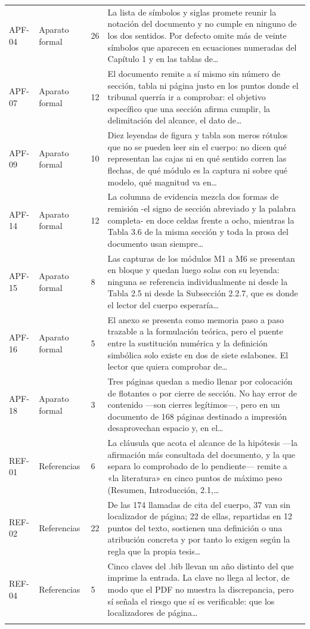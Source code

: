 {\begin{longtable}{@{}L{1.4cm}L{2.6cm}L{1.2cm}L{10.05cm}@{}}
APF-04 & Aparato formal & 26 & La lista de símbolos y siglas promete reunir la notación del documento y no cumple en ninguno de los dos sentidos. Por defecto omite más de veinte símbolos que aparecen en ecuaciones numeradas del Capítulo 1 y en las tablas de…\\\addlinespace[2pt]
APF-07 & Aparato formal & 12 & El documento remite a sí mismo sin número de sección, tabla ni página justo en los puntos donde el tribunal querría ir a comprobar: el objetivo específico que una sección afirma cumplir, la delimitación del alcance, el dato de…\\\addlinespace[2pt]
APF-09 & Aparato formal & 10 & Diez leyendas de figura y tabla son meros rótulos que no se pueden leer sin el cuerpo: no dicen qué representan las cajas ni en qué sentido corren las flechas, de qué módulo es la captura ni sobre qué modelo, qué magnitud va en…\\\addlinespace[2pt]
APF-14 & Aparato formal & 12 & La columna de evidencia mezcla dos formas de remisión -el signo de sección abreviado y la palabra completa- en doce celdas frente a ocho, mientras la Tabla 3.6 de la misma sección y toda la prosa del documento usan siempre…\\\addlinespace[2pt]
APF-15 & Aparato formal & 8 & Las capturas de los módulos M1 a M6 se presentan en bloque y quedan luego solas con su leyenda: ninguna se referencia individualmente ni desde la Tabla 2.5 ni desde la Subsección 2.2.7, que es donde el lector del cuerpo esperaría…\\\addlinespace[2pt]
APF-16 & Aparato formal & 5 & El anexo se presenta como memoria paso a paso trazable a la formulación teórica, pero el puente entre la sustitución numérica y la definición simbólica solo existe en dos de siete eslabones. El lector que quiera comprobar de…\\\addlinespace[2pt]
APF-18 & Aparato formal & 3 & Tres páginas quedan a medio llenar por colocación de flotantes o por cierre de sección. No hay error de contenido —son cierres legítimos—, pero en un documento de 168 páginas destinado a impresión desaprovechan espacio y, en el…\\\addlinespace[2pt]
REF-01 & Referencias & 6 & La cláusula que acota el alcance de la hipótesis —la afirmación más consultada del documento, y la que separa lo comprobado de lo pendiente— remite a «la literatura» en cinco puntos de máximo peso (Resumen, Introducción, 2.1,…\\\addlinespace[2pt]
REF-02 & Referencias & 22 & De las 174 llamadas de cita del cuerpo, 37 van sin localizador de página; 22 de ellas, repartidas en 12 puntos del texto, sostienen una definición o una atribución concreta y por tanto lo exigen según la regla que la propia tesis…\\\addlinespace[2pt]
REF-04 & Referencias & 5 & Cinco claves del .bib llevan un año distinto del que imprime la entrada. La clave no llega al lector, de modo que el PDF no muestra la discrepancia, pero sí señala el riesgo que sí es verificable: que los localizadores de página…\\\addlinespace[2pt]
\end{longtable}}
\clearpage
